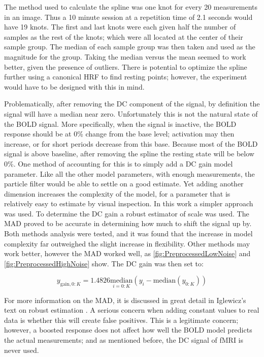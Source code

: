 The method used to calculate the spline was one knot for every 20
measurements in an image. Thus a 10 minute session at a repetition time of
2.1 seconds would have 19 knots. The first and last knots were each
given half the number of samples as the rest of the knots; which were all
located at the center of their sample group. The median of each sample group
was then taken and used as the magnitude for the group. Taking the median
versus the mean seemed to work better, given the presence of outliers.
There is potential to optimize the spline further using a canonical
HRF to find resting points; however, the experiment would have
to be designed with this in mind.

Problematically, after removing the \ac{DC} component of the signal,
by definition the signal will have a median near zero.
Unfortunately this is not the natural state of the \ac{BOLD} signal. More specifically,
when the signal is inactive, the \ac{BOLD} response should be at 0\% change from
the base level; activation may then increase, or for short periods decrease from this base.
Because most of the \ac{BOLD} signal is above baseline, after removing the spline
the resting state will be below 0\%.
One method of accounting for this is to simply add a \ac{DC} gain model parameter.
Like all the other model parameters, with enough measurements, the particle filter
would be able to settle on a good estimate. Yet adding another dimension increases the
complexity of the model, for a parameter that is relatively easy to estimate
by visual inspection.  In this work a simpler approach was used. To determine
the \ac{DC} gain a robust estimator of scale was used. The 
\ac{MAD} proved to be accurate in determining how much to shift the signal up
by. Both methods analysis were tested, and it was found that the increase
in model complexity far outweighed the slight increase in flexibility. Other
methods may work better, however the \ac{MAD} worked well,
as \autoref{fig:PreprocessedLowNoise} and 
\autoref{fig:PreprocessedHighNoise} show. The \ac{DC} gain was then set to:

\begin{equation}
y_{\text{gain}, 0:K} = 1.4826\underset{i=0:K}{\text{median}}(y_i - \text{median}(y_{0:K}))
\label{eq:mad}
\end{equation}

For more information on the \ac{MAD}, it is discussed in great detail in
Iglewicz's text on robust estimation \cite{iglewicz1983robust}.
A serious concern when adding constant values to
real data is whether this will create false positives. This is a legitimate
concern; however, a boosted response does not affect how well the \ac{BOLD} model
predicts the actual measurements; and as mentioned before, the \ac{DC} signal 
of \ac{fMRI} is never used.

